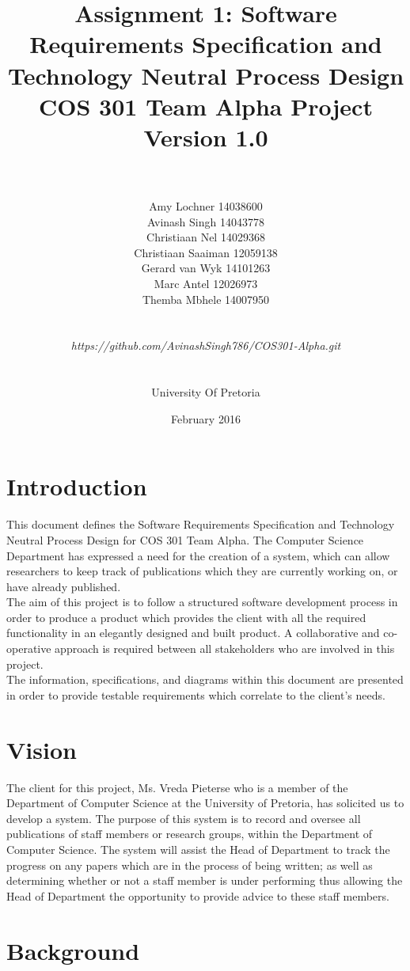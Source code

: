 \documentclass[a4paper]{article}
\title{\huge Assignment 1: Software Requirements Specification and Technology Neutral Process Design
	\\COS 301 Team Alpha Project
	\\Version 1.0}
\author{\\\\Amy Lochner 14038600\\ Avinash Singh 14043778 \\
	Christiaan Nel 14029368\\ Christiaan Saaiman 12059138 \\
	Gerard van Wyk 14101263\\ Marc Antel 12026973\\
	Themba Mbhele 14007950
	\\
	\\
	\\\textit{https://github.com/AvinashSingh786/COS301-Alpha.git}
	\\
	\\
	\\ University Of Pretoria\\}
\date{February 2016}
\begin{document}
	
	\maketitle

	\newpage

	\tableofcontents
	\newpage
	
	\section{Introduction}
	
	This document defines the Software Requirements Specification and Technology Neutral Process Design for COS 301 Team Alpha. The Computer Science Department has expressed a need for the creation of a system, which can allow researchers to keep track of publications which they are currently working on, or have already published.
	\\
	The aim of this project is to follow a structured software development process in order to produce a product which provides the client with all the required functionality in an elegantly designed and built product. A collaborative and co-operative approach is required between all stakeholders who are involved in this project. 
	\\
	The information, specifications, and diagrams within this document are presented in order to provide testable requirements which correlate to the client's needs.
	
	\section{Vision}
	The client for this project, Ms. Vreda Pieterse who is a member of the Department of Computer Science at the University of Pretoria, has solicited us to develop a system. The purpose of this system is to record and oversee all publications of staff members or research groups, within the Department of Computer Science. The system will assist the Head of Department to track the progress on any papers which are in the process of being written; as well as determining whether or not a staff member is under performing thus allowing the Head of Department the opportunity to provide advice to these staff members.
	
	\section{Background}
\end{document}
